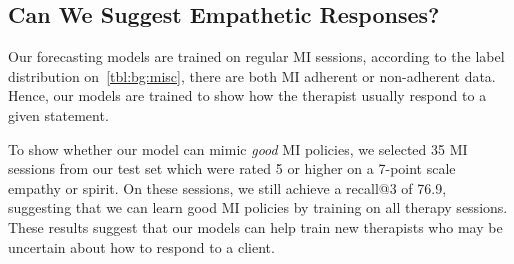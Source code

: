 \subsection{Can We Suggest Empathetic Responses?}

Our forecasting models are trained on regular MI sessions, according
to the label distribution on~\autoref{tbl:bg:misc}, there are both MI
adherent or non-adherent data. Hence, our models are trained to show
how the therapist usually respond to a given statement.

To show whether our model can mimic {\em good} MI policies, we
selected 35 MI sessions from our test set which were rated 5 or
higher on a 7-point scale empathy or spirit. On these sessions, we
still achieve a recall@3 of 76.9, suggesting that we can learn good
MI policies by training on all therapy sessions. These results
suggest that our models can help train new
therapists who may be uncertain about how to respond to a client.




